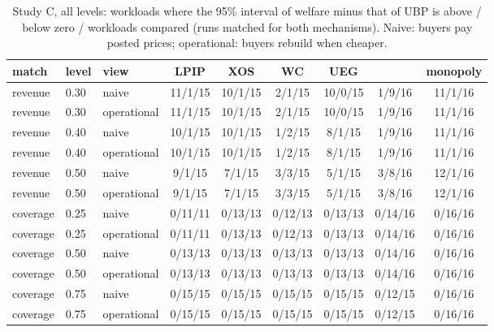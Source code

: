 
\begin{table}[tp]
  \centering
  \footnotesize
  \caption{Study C, all levels: workloads where the 95\% interval of welfare minus that of UBP is above / below zero / workloads compared (runs matched for both mechanisms). Naive: buyers pay posted prices; operational: buyers rebuild when cheaper.}
  \label{tab:app-studyC}
  \begin{tabular}{@{}lllcccccc@{}}
    \toprule
    match & level & view & LPIP & XOS & \qirana{} WC & \qirana{} UEG & \querymarket{} & monopoly \\
    \midrule
    revenue & 0.30 & naive & 11/1/15 & 10/1/15 & 2/1/15 & 10/0/15 & 1/9/16 & 11/1/16 \\
    revenue & 0.30 & operational & 11/1/15 & 10/1/15 & 2/1/15 & 10/0/15 & 1/9/16 & 11/1/16 \\
    revenue & 0.40 & naive & 10/1/15 & 10/1/15 & 1/2/15 & 8/1/15 & 1/9/16 & 11/1/16 \\
    revenue & 0.40 & operational & 10/1/15 & 10/1/15 & 1/2/15 & 8/1/15 & 1/9/16 & 11/1/16 \\
    revenue & 0.50 & naive & 9/1/15 & 7/1/15 & 3/3/15 & 5/1/15 & 3/8/16 & 12/1/16 \\
    revenue & 0.50 & operational & 9/1/15 & 7/1/15 & 3/3/15 & 5/1/15 & 3/8/16 & 12/1/16 \\
    coverage & 0.25 & naive & 0/11/11 & 0/13/13 & 0/12/13 & 0/13/13 & 0/14/16 & 0/16/16 \\
    coverage & 0.25 & operational & 0/11/11 & 0/13/13 & 0/12/13 & 0/13/13 & 0/14/16 & 0/16/16 \\
    coverage & 0.50 & naive & 0/13/13 & 0/13/13 & 0/13/13 & 0/13/13 & 0/14/16 & 0/16/16 \\
    coverage & 0.50 & operational & 0/13/13 & 0/13/13 & 0/13/13 & 0/13/13 & 0/14/16 & 0/16/16 \\
    coverage & 0.75 & naive & 0/15/15 & 0/15/15 & 0/15/15 & 0/15/15 & 0/12/15 & 0/16/16 \\
    coverage & 0.75 & operational & 0/15/15 & 0/15/15 & 0/15/15 & 0/15/15 & 0/12/15 & 0/16/16 \\
    \bottomrule
  \end{tabular}
\end{table}
